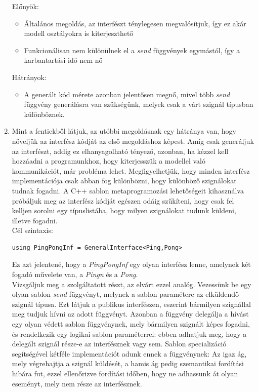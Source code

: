 \documentclass[a4paper,12pt]{report}
\begin{document}
\begin{enumerate}
Előnyök:
\begin{itemize}
\item Általános megoldás, az interfészt ténylegesen megvalósítjuk, így ez akár modell osztályokra is kiterjeszthető
\item Funkcionálisan nem különülnek el a \textit{send} függvények egymástól, így a karbantartási idő nem nő
\end{itemize}
Hátrányok:
\begin{itemize}
\item A generált kód mérete azonban jelentősen megnő, mivel több \textit{send} függvény generálásra van szükségünk, melyek csak a várt szignál típusban különböznek.
\end{itemize}
\item Mint a fentiekből látjuk, az utóbbi megoldásnak egy hátránya van, hogy növeljük az interfész kódját az első megoldáshoz képest. Amíg csak generáljuk az interfészt, addig ez elhanyagolható tényező, azonban, ha kézzel kell hozzáadni a programunkhoz, hogy kiterjesszük a modellel való kommunikációt, már probléma lehet. Megfigyelhetjük, hogy minden interfész implementációja csak abban fog különbözni, hogy különböző szignálokat tudnak fogadni. A C++ sablon metaprogramozási lehetőségeit kihasználva próbáljuk meg az interfész kódját egészen odáig szűkíteni, hogy csak fel kelljen sorolni egy típuslistába, hogy milyen szignálokat tudunk küldeni, illetve fogadni. \\
Cél szintaxis: 
\begin{lstlisting}
using PingPongInf = GeneralInterface<Ping,Pong>
\end{lstlisting}
Ez azt jelentené, hogy a \textit{PingPongInf} egy olyan interfész lenne, amelynek két fogadó művelete van, a \textit{Pingn} és a \textit{Pong}.\\
Vizsgáljuk meg a szolgáltatott részt, az elvárt ezzel analóg. Vezessünk be egy olyan sablon \textit{send} függvényt, melynek a sablon paramétere az elküldendő szignál típusa. Ezt látjuk a publikus interfészen, eszerint bármilyen szignállal meg tudjuk hívni az adott függvényt. Azonban a függvény delegálja a hívást egy olyan védett sablon függvénynek, mely bármilyen szignált képes fogadni, és rendelkezik egy logikai sablon paraméterrel: ebben adhatjuk meg, hogy a delegált szignál része-e az interfésznek vagy sem. 
Sablon specializáció segítségével kétféle implementációt adunk ennek a függvénynek: Az igaz ág, mely végrehajtja a szignál küldését, a hamis ág pedig szemantikai fordítási hibára fut, ezzel ellenőrizve fordítási időben, hogy ne adhassunk át olyan eseményt, mely nem része az interfésznek. \\

\end{enumerate}
\end{document}
